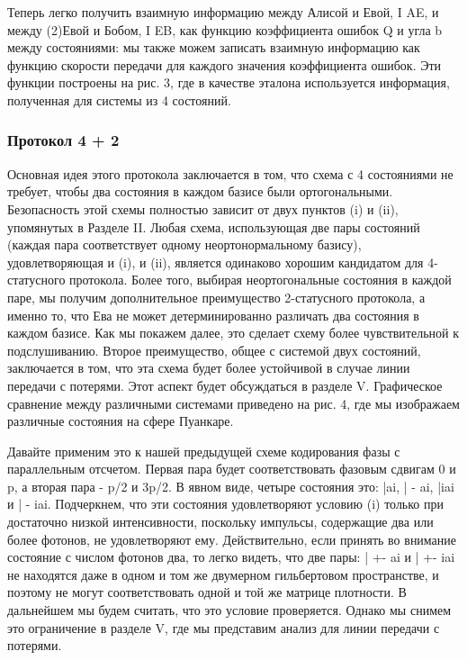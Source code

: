 Теперь легко получить взаимную информацию между Алисой и Евой, I AE, и между (2)Евой и Бобом, I EB, как функцию коэффициента ошибок Q и угла b между состояниями: мы также можем записать взаимную информацию как функцию скорости передачи для каждого значения коэффициента ошибок. Эти функции построены на рис. 3, где в качестве эталона используется информация, полученная для системы из 4 состояний.

\subsubsection{Протокол 4 + 2}

Основная идея этого протокола заключается в том, что схема с 4 состояниями не требует, чтобы два состояния в каждом базисе были ортогональными. Безопасность этой схемы полностью зависит от двух пунктов (i) и (ii), упомянутых в Разделе II. Любая схема, использующая две пары состояний (каждая пара соответствует одному неортонормальному базису), удовлетворяющая и (i), и (ii), является одинаково хорошим кандидатом для 4-статусного протокола. Более того, выбирая неортогональные состояния в каждой паре, мы получим дополнительное преимущество 2-статусного протокола, а именно то, что Ева не может детерминированно различать два состояния в каждом базисе. Как мы покажем далее, это сделает схему более чувствительной к подслушиванию. Второе преимущество, общее с системой двух состояний, заключается в том, что эта схема будет более устойчивой в случае линии передачи с потерями. Этот аспект будет обсуждаться в разделе V. Графическое сравнение между различными системами приведено на рис. 4, где мы изображаем различные состояния на сфере Пуанкаре.

Давайте применим это к нашей предыдущей схеме кодирования фазы с параллельным отсчетом. Первая пара будет соответствовать фазовым сдвигам 0 и p, а вторая пара - p/2 и 3p/2. В явном виде, четыре состояния это: |ai, | - ai, |iai и | - iai. Подчеркнем, что эти состояния удовлетворяют условию (i) только при достаточно низкой интенсивности, поскольку импульсы, содержащие два или более фотонов, не удовлетворяют ему. Действительно, если принять во внимание состояние с числом фотонов два, то легко видеть, что две пары: | +- ai и | +- iai не находятся даже в одном и том же двумерном гильбертовом пространстве, и поэтому не могут соответствовать одной и той же матрице плотности. В дальнейшем мы будем считать, что это условие проверяется. Однако мы снимем это ограничение в разделе V, где мы представим анализ для линии передачи с потерями.

